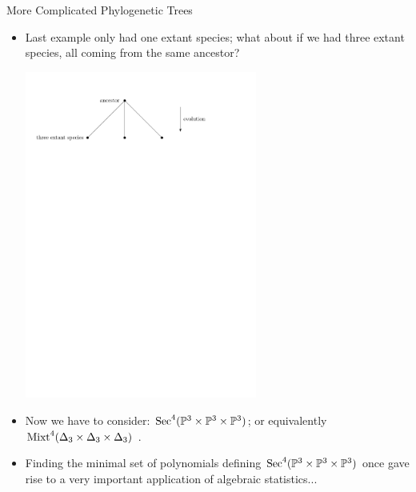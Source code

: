 \begin{frame}{More Complicated Phylogenetic Trees}

    \begin{itemize}
        \item Last example only had one extant species; what about if we had three extant species, all coming from the same ancestor?

    \begin{center}
        \includegraphics[width=0.6\textwidth, angle=0]{resources/three-extant.pdf}
    \end{center}

    \item Now we have to consider: $\operatorname{Sec}^{4}(\mathbb{P}^{3} \times \mathbb{P}^{3} \times \mathbb{P}^{3})$; or equivalently $\operatorname{Mixt}^{4}(\Delta_{3} \times \Delta_{3} \times \Delta_{3})$ \cite{EAsalmon}.

    \item Finding the minimal set of polynomials defining $\operatorname{Sec}^{4}(\mathbb{P}^{3} \times \mathbb{P}^{3} \times \mathbb{P}^{3})$ once gave rise to a very important application of algebraic statistics...

    \end{itemize}

\end{frame}

